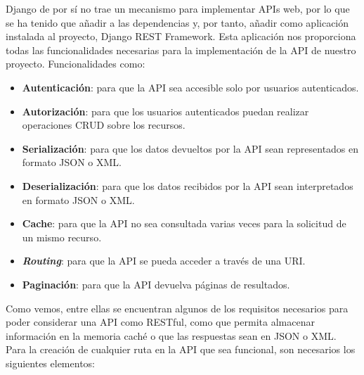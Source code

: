 Django de por sí no trae un mecanismo para implementar APIs web, por lo que se ha tenido
que añadir a las dependencias y, por tanto, añadir como aplicación instalada al proyecto,
Django REST Framework. Esta aplicación nos proporciona todas las funcionalidades
necesarias para la implementación de la API de nuestro proyecto. Funcionalidades como:

    \begin{itemize}
        \item \textbf{Autenticación}: para que la API sea accesible solo por usuarios
        autenticados.
        \item \textbf{Autorización}: para que los usuarios autenticados puedan realizar
        operaciones CRUD sobre los recursos.
        \item \textbf{Serialización}: para que los datos devueltos por la API sean
        representados en formato JSON o XML.
        \item \textbf{Deserialización}: para que los datos recibidos por la API sean
        interpretados en formato JSON o XML.
        \item \textbf{Cache}: para que la API no sea consultada varias veces para la
        solicitud de un mismo recurso.
        \item \textbf{\textit{Routing}}: para que la API se pueda acceder a través de una
        URI.
        \item \textbf{Paginación}: para que la API devuelva páginas de resultados.
    \end{itemize}

Como vemos, entre ellas se encuentran algunos de los requisitos necesarios para poder
considerar una API como RESTful, como que permita almacenar información en la memoria
caché o que las respuestas sean en JSON o XML.\\

Para la creación de cualquier ruta en la API que sea funcional, son necesarios los
siguientes elementos:

